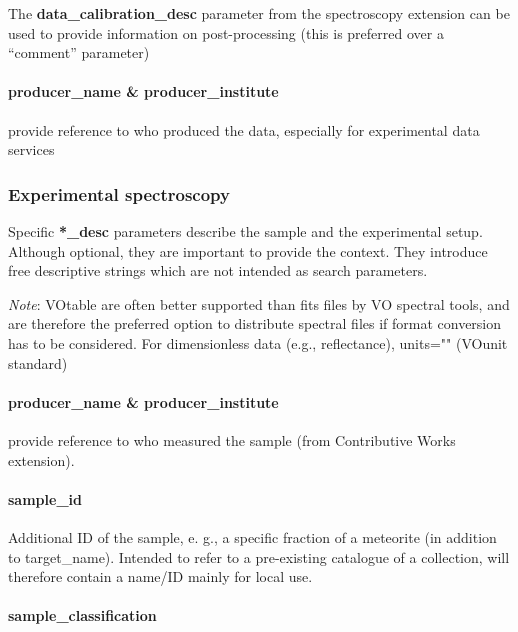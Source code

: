 \documentclass[11pt,a4paper]{ivoa}
\begin{document}
The\textbf{ \textbf{data\_calibration\_desc}} parameter from the spectroscopy extension can be used to provide information on post-processing (this is preferred over a ``comment'' parameter)

\paragraph{producer\_name \& producer\_institute\\}

provide reference to who produced the data, especially for experimental data services

\subsubsection{Experimental spectroscopy\\}

Specific \textbf{*\_desc} parameters describe the sample and the experimental setup. Although optional, they are important to provide the context. They introduce free descriptive strings which are not intended as search parameters.

\emph{Note}: VOtable are often better supported than fits files by VO spectral tools, and are therefore the preferred option to distribute spectral files if format conversion has to be considered. For dimensionless data (e.g., reflectance), units="" (VOunit standard)

\paragraph{producer\_name \& producer\_institute}

provide reference to who measured the sample (from Contributive Works extension).

\paragraph{sample\_id}

Additional ID of the sample, e. g., a specific fraction of a meteorite (in addition to target\_name). Intended to refer to a pre-existing catalogue of a collection, will therefore contain a name/ID mainly for local use. 

\paragraph{sample\_classification}
\end{document}
